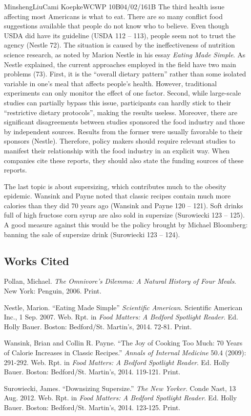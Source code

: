 \documentclass[12pt,letterpaper]{article}
\begin{document}
\begin{mla}{Minsheng}{Liu}{Cami Koepke}{WCWP 10B}{04/02/16}{1B}
The third health issue affecting most Americans is what to eat. There
are so many conflict food suggestions available that people do not know
who to believe. Even though USDA did have its guideline (USDA 112 --
113), people seem not to trust the agency (Nestle 72). The situation is
caused by the ineffectiveness of nutrition science research, as noted by
Marion Nestle in his essay \emph{Eating Made Simple}. As Nestle
explained, the current approaches employed in the field have two main
problems (73). First, it is the ``overall dietary pattern'' rather than
some isolated variable in one's meal that affects people's health.
However, traditional experiments can only monitor the effect of one
factor. Second, while large-scale studies can partially bypass this
issue, participants can hardly stick to their ``restrictive dietary
protocols'', making the results useless. Moreover, there are significant
disagreements between studies sponsored the food industry and those by
independent sources. Results from the former were usually favorable to
their sponsors (Nestle). Therefore, policy makers should require
relevant studies to manifest their relationship with the food industry
in an explicit way. When companies cite these reports, they should also
state the funding sources of these reports.

The last topic is about supersizing, which contributes much to the
obesity epidemic. Wansink and Payne noted that classic recipes contain
much more calories than they did 70 years ago (Wansink and Payne 120 --
121). Soft drinks full of high fructose corn syrup are also sold in
supersize (Surowiecki 123 -- 125). A good measure against this would be
the policy brought by Michael Bloomberg: banning the sale of supersize
drink (Surowiecki 123 -- 124).

\subsection*{Works Cited}
\bibent Pollan, Michael. \textit{The Omnivore's Dilemma: A Natural History of Four Meals}. New York: Penguin, 2006. Print.

\bibent Nestle, Marion. ``Eating Made Simple'' \textit{Scientific American}. Scientific American Inc., 1 Sep. 2007. Web. Rpt. in \textit{Food Matters: A Bedford Spotlight Reader}. Ed. Holly Bauer. Boston: Bedford/St. Martin's, 2014. 72-81. Print.

\bibent Wansink, Brian and Collin R. Payne. ``The Joy of Cooking Too Much: 70 Years of Calorie Increases in Classic Recipes.'' \textit{Annals of Internal Medicine} 50.4 (2009): 291-292. Web. Rpt. in \textit{Food Matters: A Bedford Spotlight Reader}. Ed. Holly Bauer. Boston: Bedford/St. Martin’s, 2014. 119-121. Print.

\bibent Surowiecki, James. ``Downsizing Supersize.'' \textit{The New Yorker}. Conde Nast, 13 Aug. 2012. Web. Rpt. in \textit{Food Matters: A Bedford Spotlight Reader}. Ed. Holly Bauer. Boston: Bedford/St. Martin’s, 2014. 123-125. Print.

\end{mla}
\end{document}
